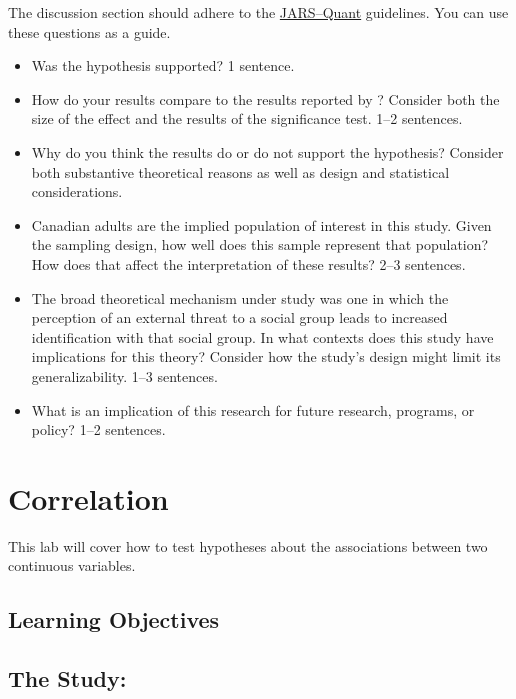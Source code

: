 \documentclass[
]{book}
\providecommand{\tightlist}{%
  \setlength{\itemsep}{0pt}\setlength{\parskip}{0pt}}
\begin{document}
The discussion section should adhere to the \href{https://apastyle.apa.org/jars/quantitative}{JARS--Quant} guidelines. You can use these questions as a guide.

\begin{itemize}
\tightlist
\item
  Was the hypothesis supported? 1 sentence.
\item
  How do your results compare to the results reported by \citet{davies2008}? Consider both the size of the effect and the results of the significance test. 1--2 sentences.
\item
  Why do you think the results do or do not support the hypothesis? Consider both substantive theoretical reasons as well as design and statistical considerations.
\item
  Canadian adults are the implied population of interest in this study. Given the sampling design, how well does this sample represent that population? How does that affect the interpretation of these results? 2--3 sentences.
\item
  The broad theoretical mechanism under study was one in which the perception of an external threat to a social group leads to increased identification with that social group. In what contexts does this study have implications for this theory? Consider how the study's design might limit its generalizability. 1--3 sentences.
\item
  What is an implication of this research for future research, programs, or policy? 1--2 sentences.
\end{itemize}

\hypertarget{cor}{%
\chapter{Correlation}\label{cor}}

This lab will cover how to test hypotheses about the associations between two continuous variables.

\hypertarget{cor-learning-objectives}{%
\section{Learning Objectives}\label{cor-learning-objectives}}

\hypertarget{cor-study}{%
\section{The Study:}\label{cor-study}}
\end{document}
